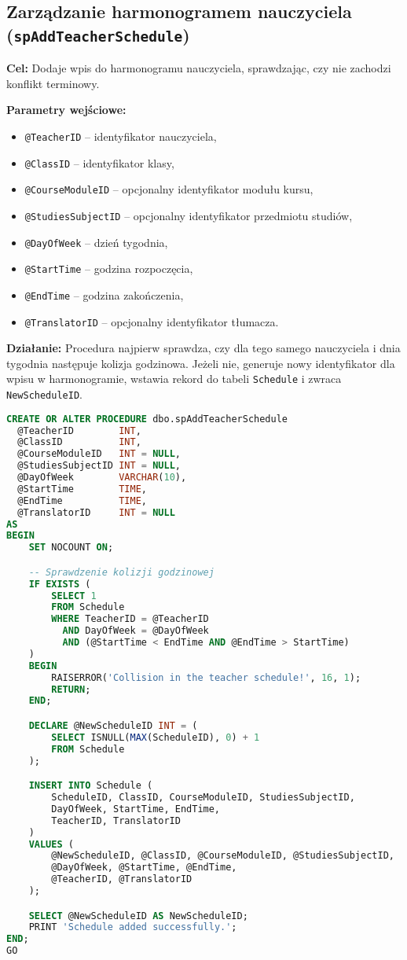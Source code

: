 \documentclass[12pt]{article}
\begin{document}
\newpage
\subsection{Zarządzanie harmonogramem nauczyciela (\texttt{spAddTeacherSchedule})}
\textbf{Cel:} Dodaje wpis do harmonogramu nauczyciela, sprawdzając, czy nie zachodzi konflikt terminowy.

\textbf{Parametry wejściowe:}
\begin{itemize}
  \item \texttt{@TeacherID} – identyfikator nauczyciela,
  \item \texttt{@ClassID} – identyfikator klasy,
  \item \texttt{@CourseModuleID} – opcjonalny identyfikator modułu kursu,
  \item \texttt{@StudiesSubjectID} – opcjonalny identyfikator przedmiotu studiów,
  \item \texttt{@DayOfWeek} – dzień tygodnia,
  \item \texttt{@StartTime} – godzina rozpoczęcia,
  \item \texttt{@EndTime} – godzina zakończenia,
  \item \texttt{@TranslatorID} – opcjonalny identyfikator tłumacza.
\end{itemize}

\textbf{Działanie:} Procedura najpierw sprawdza, czy dla tego samego nauczyciela i dnia tygodnia następuje kolizja godzinowa. Jeżeli nie, generuje nowy identyfikator dla wpisu w harmonogramie, wstawia rekord do tabeli \verb|Schedule| i zwraca \verb|NewScheduleID|.

\begin{lstlisting}[language=SQL]
CREATE OR ALTER PROCEDURE dbo.spAddTeacherSchedule
  @TeacherID        INT,
  @ClassID          INT,
  @CourseModuleID   INT = NULL,
  @StudiesSubjectID INT = NULL,
  @DayOfWeek        VARCHAR(10),
  @StartTime        TIME,
  @EndTime          TIME,
  @TranslatorID     INT = NULL
AS
BEGIN
    SET NOCOUNT ON;

    -- Sprawdzenie kolizji godzinowej
    IF EXISTS (
        SELECT 1
        FROM Schedule
        WHERE TeacherID = @TeacherID
          AND DayOfWeek = @DayOfWeek
          AND (@StartTime < EndTime AND @EndTime > StartTime)
    )
    BEGIN
        RAISERROR('Collision in the teacher schedule!', 16, 1);
        RETURN;
    END;

    DECLARE @NewScheduleID INT = (
        SELECT ISNULL(MAX(ScheduleID), 0) + 1
        FROM Schedule
    );

    INSERT INTO Schedule (
        ScheduleID, ClassID, CourseModuleID, StudiesSubjectID,
        DayOfWeek, StartTime, EndTime,
        TeacherID, TranslatorID
    )
    VALUES (
        @NewScheduleID, @ClassID, @CourseModuleID, @StudiesSubjectID,
        @DayOfWeek, @StartTime, @EndTime,
        @TeacherID, @TranslatorID
    );

    SELECT @NewScheduleID AS NewScheduleID;
    PRINT 'Schedule added successfully.';
END;
GO
\end{lstlisting}
\end{document}
